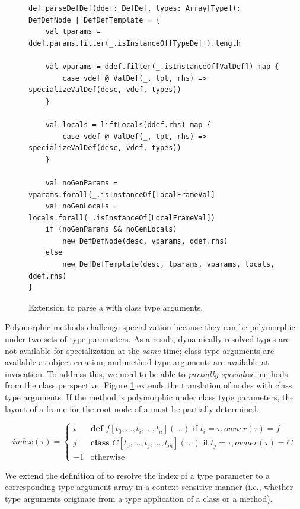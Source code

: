 \begin{figure}[!htb]
\begin{verbatim}
def parseDefDef(ddef: DefDef, types: Array[Type]): DefDefNode | DefDefTemplate = {
	val tparams = ddef.params.filter(_.isInstanceOf[TypeDef]).length
	
	val vparams = ddef.filter(_.isInstanceOf[ValDef]) map {
		case vdef @ ValDef(_, tpt, rhs) => specializeValDef(desc, vdef, types))
	}

	val locals = liftLocals(ddef.rhs) map {
		case vdef @ ValDef(_, tpt, rhs) => specializeValDef(desc, vdef, types))
	}
	
	val noGenParams = vparams.forall(_.isInstanceOf[LocalFrameVal]
	val noGenLocals = locals.forall(_.isInstanceOf[LocalFrameVal])
	if (noGenParams && noGenLocals)
		new DefDefNode(desc, vparams, ddef.rhs)
	else 
		new DefDefTemplate(desc, tparams, vparams, locals, ddef.rhs)
}
\end{verbatim}
\caption{Extension to parse a  with class type arguments.}
\label{impl:parse-poly-defdef-cls}
\end{figure}

Polymorphic methods challenge specialization because they can be polymorphic under two sets of type parameters.
As a result, dynamically resolved types are not available for specialization at the \textit{same} time; class type arguments are available at object creation, and method type arguments are available at invocation.
To address this, we need to be able to \textit{partially specialize} methods from the class perspective.
Figure \ref{impl:parse-poly-defdef-cls} extends the translation of  nodes with class type arguments.
If the method is polymorphic under class type parameters, the layout of a frame for the root node of a  must be partially determined.

$$
index(\tau) = 
\begin{cases}
	i  & \textbf{def } f[t_0, \ldots, t_i, \ldots, t_n](\ldots) \text{ if } t_i = \tau, owner(\tau)=f \\
	j  & \textbf{class } C[t_0, \ldots, t_j, \ldots, t_m](\ldots) \text{ if } t_j = \tau, owner(\tau)=C \\
	-1 & \text{otherwise}
\end{cases}
$$

We extend the definition of  to resolve the index of a type parameter to a corresponding type argument array in a context-sensitive manner (i.e., whether type arguments originate from a type application of a class or a method).

